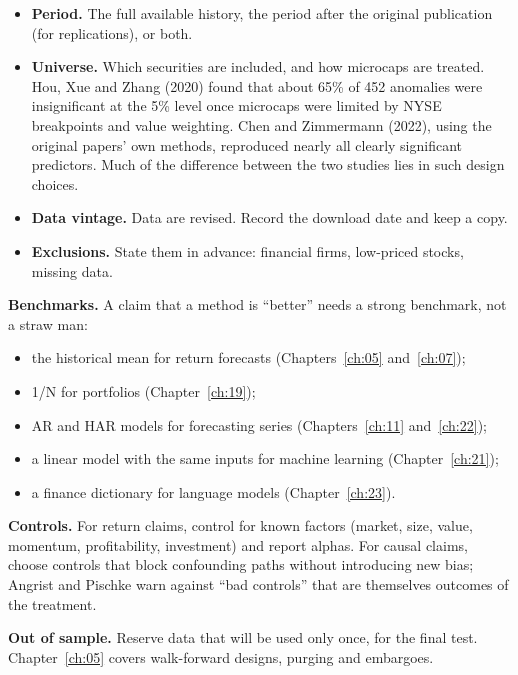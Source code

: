 \begin{itemize}
  \item \textbf{Period.} The full available history, the period after the original publication (for replications), or both.
  \item \textbf{Universe.} Which securities are included, and how microcaps are treated. Hou, Xue and Zhang (2020) found that about 65\% of 452 anomalies were insignificant at the 5\% level once microcaps were limited by NYSE breakpoints and value weighting. Chen and Zimmermann (2022), using the original papers' own methods, reproduced nearly all clearly significant predictors. Much of the difference between the two studies lies in such design choices.
  \item \textbf{Data vintage.} Data are revised. Record the download date and keep a copy.
  \item \textbf{Exclusions.} State them in advance: financial firms, low-priced stocks, missing data.
\end{itemize}

\textbf{Benchmarks.} A claim that a method is ``better'' needs a strong benchmark, not a straw man:

\begin{itemize}
  \item the historical mean for return forecasts (Chapters~\ref{ch:05} and~\ref{ch:07});
  \item 1/N for portfolios (Chapter~\ref{ch:19});
  \item AR and HAR models for forecasting series (Chapters~\ref{ch:11} and~\ref{ch:22});
  \item a linear model with the same inputs for machine learning (Chapter~\ref{ch:21});
  \item a finance dictionary for language models (Chapter~\ref{ch:23}).
\end{itemize}

\textbf{Controls.} For return claims, control for known factors (market, size, value, momentum, profitability, investment) and report alphas. For causal claims, choose controls that block confounding paths without introducing new bias; Angrist and Pischke warn against ``bad controls'' that are themselves outcomes of the treatment.

\textbf{Out of sample.} Reserve data that will be used only once, for the final test. Chapter~\ref{ch:05} covers walk-forward designs, purging and embargoes.

